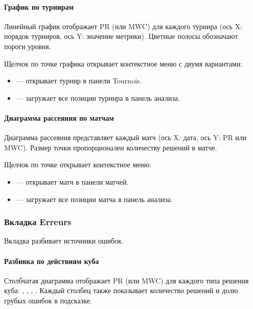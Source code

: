 \documentclass[letterpaper,10pt,russian]{sphinxmanual}
\begin{document}
\paragraph{График по турнирам}
\label{\detokenize{manuel:courbe-par-tournoi}}
\sphinxAtStartPar
Линейный график отображает PR (или MWC) для каждого турнира (ось X: порядок турниров, ось Y: значение метрики). Цветные полосы обозначают пороги уровня.

\sphinxAtStartPar
Щелчок по точке графика открывает контекстное меню с двумя вариантами:
\begin{itemize}
\item {} 
\sphinxAtStartPar
{} — открывает турнир в панели Tournois.

\item {} 
\sphinxAtStartPar
{} — загружает все позиции турнира в панель анализа.

\end{itemize}


\paragraph{Диаграмма рассеяния по матчам}
\label{\detokenize{manuel:scatter-plot-par-match}}
\sphinxAtStartPar
Диаграмма рассеяния представляет каждый матч (ось X: дата, ось Y: PR или MWC). Размер точки пропорционален количеству решений в матче.

\sphinxAtStartPar
Щелчок по точке открывает контекстное меню:
\begin{itemize}
\item {} 
\sphinxAtStartPar
{} — открывает матч в панели матчей.

\item {} 
\sphinxAtStartPar
{} — загружает все позиции матча в панель анализа.

\end{itemize}


\subsubsection{Вкладка Erreurs}
\label{\detokenize{manuel:onglet-erreurs}}
\sphinxAtStartPar
Вкладка  разбивает источники ошибок.


\paragraph{Разбивка по действиям куба}
\label{\detokenize{manuel:repartition-par-action-de-videau}}
\sphinxAtStartPar
Столбчатая диаграмма отображает PR (или MWC) для каждого типа решения куба: , , , . Каждый столбец также показывает количество решений и долю грубых ошибок в подсказке.
\end{document}

